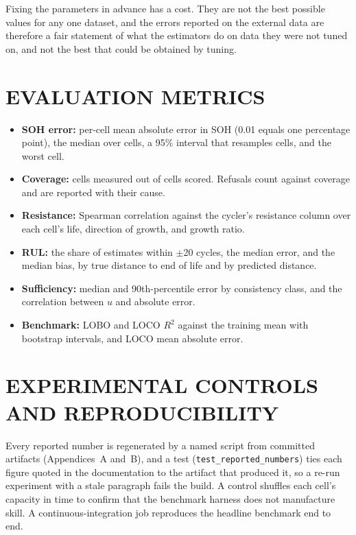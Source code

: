 Fixing the parameters in advance has a cost. They are not the best possible values for any one dataset, and the errors reported on the external data are therefore a fair statement of what the estimators do on data they were not tuned on, and not the best that could be obtained by tuning.

\section{EVALUATION METRICS}
\label{sec:metrics}

\begin{itemize}
    \item \textbf{SOH error:} per-cell mean absolute error in SOH (0.01 equals one percentage point), the median over cells, a 95\% interval that resamples cells, and the worst cell.
    \item \textbf{Coverage:} cells measured out of cells scored. Refusals count against coverage and are reported with their cause.
    \item \textbf{Resistance:} Spearman correlation against the cycler's resistance column over each cell's life, direction of growth, and growth ratio.
    \item \textbf{RUL:} the share of estimates within $\pm$20 cycles, the median error, and the median bias, by true distance to end of life and by predicted distance.
    \item \textbf{Sufficiency:} median and 90th-percentile error by consistency class, and the correlation between $u$ and absolute error.
    \item \textbf{Benchmark:} LOBO and LOCO $R^2$ against the training mean with bootstrap intervals, and LOCO mean absolute error.
\end{itemize}

\section{EXPERIMENTAL CONTROLS AND REPRODUCIBILITY}
\label{sec:repro}

Every reported number is regenerated by a named script from committed artifacts (Appendices~A and~B), and a test (\texttt{test\_reported\_numbers}) ties each figure quoted in the documentation to the artifact that produced it, so a re-run experiment with a stale paragraph fails the build. A control shuffles each cell's capacity in time to confirm that the benchmark harness does not manufacture skill. A continuous-integration job reproduces the headline benchmark end to end.
